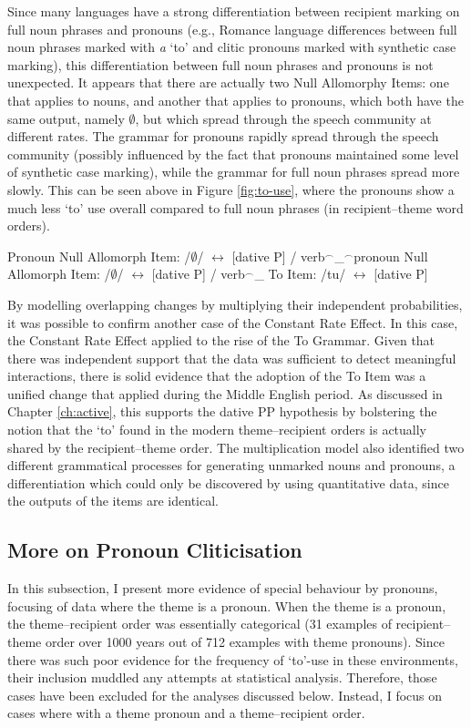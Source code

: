 	Since many languages have a strong differentiation between recipient marking on full noun phrases and pronouns (e.g., Romance language differences between full noun phrases marked with \textit{a} `to' and clitic pronouns marked with synthetic case marking), this differentiation between full noun phrases and pronouns is not unexpected. It appears that there are actually two Null Allomorphy Items: one that applies to nouns, and another that applies to pronouns, which both have the same output, namely $\emptyset$, but which spread through the speech community at different rates. The grammar for pronouns rapidly spread through the speech community (possibly influenced by the fact that pronouns maintained some level of synthetic case marking), while the grammar for full noun phrases spread more slowly. This can be seen above in Figure \ref{fig:to-use}, where the pronouns show a much less `to' use overall compared to full noun phrases (in recipient--theme word orders).

	\begin{exe}
		\ex 
		\begin{xlist}
			\ex Pronoun Null Allomorph Item: /$\emptyset$/ $\leftrightarrow$ [dative P] / verb$^{\smallfrown}$\_$^{\smallfrown}$pronoun
			\ex Null Allomorph Item: /$\emptyset$/ $\leftrightarrow$ [dative P] / verb$^{\smallfrown}$\_
			\ex To Item: /tu/ $\leftrightarrow$ [dative P]
		\end{xlist}
	\end{exe}


	By modelling overlapping changes by multiplying their independent probabilities, it was possible to confirm another case of the Constant Rate Effect. In this case, the Constant Rate Effect applied to the rise of the To Grammar. Given that there was independent support that the data was sufficient to detect meaningful interactions, there is solid evidence that the adoption of the To Item was a unified change that applied during the Middle English period. As discussed in Chapter \ref{ch:active}, this supports the dative PP hypothesis by bolstering the notion that the `to' found in the modern theme--recipient orders is actually shared by the recipient--theme order. The multiplication model also identified two different grammatical processes for generating unmarked nouns and pronouns, a differentiation which could only be discovered by using quantitative data, since the outputs of the items are identical.

	\subsection{More on Pronoun Cliticisation}
	In this subsection, I present more evidence of special behaviour by pronouns, focusing of data where the theme is a pronoun. When the theme is a pronoun, the theme--recipient order was essentially categorical (31 examples of recipient--theme order over 1000 years out of 712 examples with theme pronouns). Since there was such poor evidence for the frequency of `to'-use in these environments, their inclusion muddled any attempts at statistical analysis. Therefore, those cases have been excluded for the analyses discussed below. Instead, I focus on cases where with a theme pronoun and a theme--recipient order.


